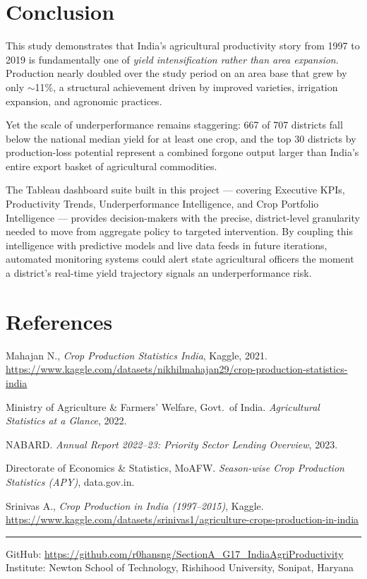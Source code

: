 \documentclass[10pt]{article}
\begin{document}
\section{Conclusion}

This study demonstrates that India's agricultural productivity story from
1997 to 2019 is fundamentally one of \textit{yield intensification rather than
area expansion}. Production nearly doubled over the study period on an area base
that grew by only $\sim$11\%, a structural achievement driven by improved
varieties, irrigation expansion, and agronomic practices.

Yet the scale of underperformance remains staggering: 667 of 707 districts fall
below the national median yield for at least one crop, and the top 30 districts
by production-loss potential represent a combined forgone output larger than
India's entire export basket of agricultural commodities.

The Tableau dashboard suite built in this project — covering Executive KPIs,
Productivity Trends, Underperformance Intelligence, and Crop Portfolio
Intelligence — provides decision-makers with the precise, district-level
granularity needed to move from aggregate policy to targeted intervention.
By coupling this intelligence with predictive models and live data feeds in
future iterations, automated monitoring systems could alert state agricultural
officers the moment a district's real-time yield trajectory signals an
underperformance risk.

\section*{References}
\begin{enumerate}[leftmargin=*, topsep=2pt, itemsep=2pt, label={[\arabic*]}]
  \item Mahajan N., \textit{Crop Production Statistics India}, Kaggle, 2021.
        \url{https://www.kaggle.com/datasets/nikhilmahajan29/crop-production-statistics-india}
  \item Ministry of Agriculture \& Farmers' Welfare, Govt.\ of India.
        \textit{Agricultural Statistics at a Glance}, 2022.
  \item NABARD. \textit{Annual Report 2022–23: Priority Sector Lending Overview}, 2023.
  \item Directorate of Economics \& Statistics, MoAFW.
        \textit{Season-wise Crop Production Statistics (APY)}, data.gov.in.
  \item Srinivas A., \textit{Crop Production in India (1997–2015)}, Kaggle.
        \url{https://www.kaggle.com/datasets/srinivas1/agriculture-crops-production-in-india}
\end{enumerate}

\vspace{6pt}
\noindent\rule{\columnwidth}{0.4pt}
\begin{center}
  \footnotesize
  GitHub: \url{https://github.com/r0hansng/SectionA_G17_IndiaAgriProductivity}\\
  Institute: Newton School of Technology, Rishihood University, Sonipat, Haryana
\end{center}
\end{document}

